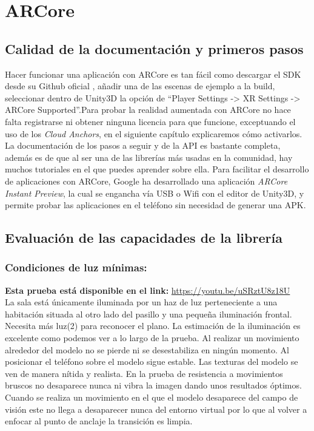 \clearpage
\section{ARCore}
\subsection{Calidad de la documentación y primeros pasos}
Hacer funcionar una aplicación con ARCore es tan fácil como descargar el SDK desde su Github oficial \cite{Github_Google}, añadir una de las escenas de ejemplo a la build, seleccionar dentro de Unity3D la opción de ``Player Settings -> XR Settings -> ARCore Supported''.Para probar la realidad aumentada con ARCore no hace falta registrarse ni obtener ninguna licencia para que funcione, exceptuando el uso de los \textit{Cloud Anchors}, en el siguiente capítulo explicaremos cómo activarlos. La documentación de los pasos a seguir y de la API es bastante completa, además es de que al ser una de las librerías más usadas en la comunidad, hay muchos tutoriales en el que puedes aprender sobre ella. Para facilitar el desarrollo de aplicaciones con ARCore, Google ha desarrollado una aplicación \textit{ARCore Instant Preview}, la cual se engancha vía USB o Wifi con el editor de Unity3D, y permite probar las aplicaciones en el teléfono sin necesidad de generar una APK.
\subsection{Evaluación de las capacidades de la librería}
\subsubsection{Condiciones de luz mínimas:}
\textbf{Esta prueba está disponible en el link:} \url{https://youtu.be/uSRztU8z18U}\\
La sala está únicamente iluminada por un haz de luz perteneciente a una habitación situada al otro lado del pasillo y una pequeña iluminación frontal.\\

Necesita más luz(2) para reconocer el plano. La estimación de la iluminación es excelente como podemos ver a lo largo de la prueba. Al realizar un movimiento alrededor del modelo no se pierde ni se desestabiliza en ningún momento. Al posicionar el teléfono sobre el modelo sigue estable. Las texturas del modelo se ven de manera nítida y realista. En la prueba de resistencia a movimientos bruscos no desaparece nunca ni vibra la imagen dando unos resultados óptimos. Cuando se realiza un movimiento en el que el modelo desaparece del campo de visión este no llega a desaparecer nunca del entorno virtual por lo que al volver a enfocar al punto de anclaje la transición es limpia.

